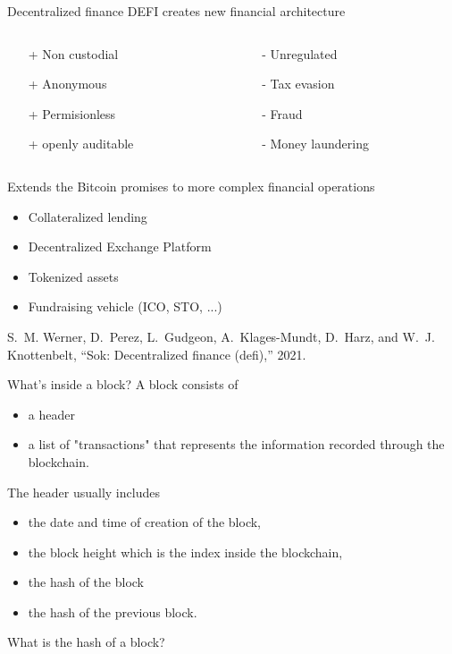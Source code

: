 \documentclass{beamer}
\begin{document}
\begin{frame}{Decentralized finance}
DEFI creates new financial architecture
\begin{columns}
\begin{column}{0.5\textwidth}
\begin{itemize}
\item[+] Non custodial
\item[+] Anonymous
\item[+] Permisionless
\item[+] openly auditable
\end{itemize}
\end{column}
\begin{column}{0.5\textwidth} 
\begin{itemize}
\item[-] Unregulated
\item[-] Tax evasion
\item[-] Fraud
\item[-] Money laundering
\end{itemize} 
\end{column}
\end{columns}
\vspace{0.5cm}
Extends the Bitcoin promises to more complex financial operations
\begin{itemize}
  \item Collateralized lending
  \item Decentralized Exchange Platform
  \item Tokenized assets
  \item Fundraising vehicle (ICO, STO, ...)
\end{itemize}
\vspace{0.3cm}
\scriptsize
\begin{thebibliography}{1}

S.~M. Werner, D.~Perez, L.~Gudgeon, A.~Klages-Mundt, D.~Harz, and W.~J.
  Knottenbelt, ``Sok: Decentralized finance (defi),'' 2021.

\end{thebibliography}

\end{frame}
\begin{frame}{What's inside a block?}
A block consists of 
\begin{itemize}
\item a header 
\item a list of "transactions" that represents the information recorded through the blockchain. 
\end{itemize}
The header usually includes 
\begin{itemize}
\item the date and time of creation of the block, 
\item the block height which is the index inside the blockchain, 
\item the hash of the block 
\item the hash of the previous block. 
\end{itemize}
\begin{tcolorbox}[enhanced,drop shadow, title=Question]
What is the hash of a block?
\end{tcolorbox}
\end{frame}
\end{document}
